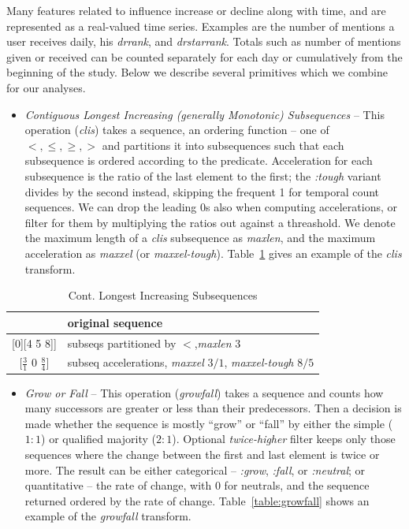 \documentclass[10pt,oneside]{memoir}
\begin{document}
Many features related to influence increase or decline along with time, and are represented as a real-valued time series.  Examples are the number of mentions a user receives daily, his {\itshape drrank}, and {\itshape drstarrank}.  Totals such as number of mentions given or received can be counted separately for each day or cumulatively from the beginning of the study.  Below we describe several primitives which we combine for our analyses.


\begin{itemize}


\item {\itshape Contiguous Longest Increasing (generally Monotonic) Subsequences} -- This operation ({\itshape clis}) takes a sequence, an ordering function -- one of $<,\leq,\geq,>$ and partitions it into subsequences such that each subsequence is ordered according to the predicate.  Acceleration for each subsequence is the ratio of the last element to the first; the {\itshape :tough} variant divides by the second instead, skipping the frequent 1 for temporal count sequences.  We can drop the leading 0s also when computing accelerations, or filter for them by multiplying the ratios out against a threashold.  We denote the maximum length of a {\itshape clis} subsequence as {\itshape maxlen}, and the maximum acceleration as {\itshape maxxel} (or {\itshape maxxel-tough}).  Table~\ref{table:clis} gives an example of the {\itshape clis} transform.
\end{itemize}


\begin{table}
    \caption{Cont. Longest Increasing Subsequences}
    \label{table:clis}

    \centering

    \begin{tabular}{|c|p{2in}|}
    \hline
        [1 2 3 0 4 5 8] & original sequence\\
    \hline
        [[1 2 3][0][4 5 8]] & subseqs partitioned by $<$,\emph{maxlen} $3$  \\
    \hline
        $[\frac{3}{1}$ 0 $\frac{8}{4}]$ & subseq accelerations, \emph{maxxel} $3/1$, \emph{maxxel-tough} $8/5$ \\
    \hline
    \end{tabular}
\end{table}
\begin{itemize}


\item {\itshape Grow or Fall} -- This operation ({\itshape growfall}) takes a sequence and counts how many successors are greater or less than their predecessors.  Then a decision is made whether the sequence is mostly ``grow'' or ``fall'' by either the simple ($1:1$) or qualified majority ($2:1$).  Optional {\itshape twice-higher} filter keeps only those sequences where the change between the first and last element is twice or more.  The result can be either categorical -- {\itshape :grow}, {\itshape :fall}, or {\itshape :neutral}; or quantitative -- the rate of change, with 0 for neutrals, and the sequence returned ordered by the rate of change.  Table~\ref{table:growfall} shows an example of the {\itshape growfall} transform.
\end{itemize}
\end{document}
